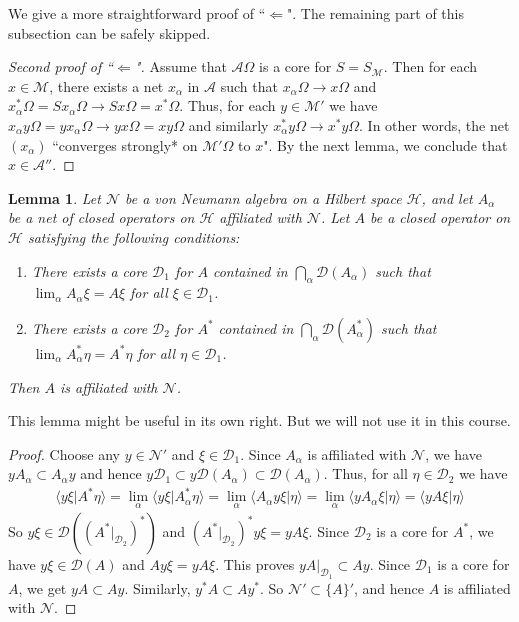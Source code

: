 \documentclass[12pt,b5paper,notitlepage]{article}
\theoremstyle{definition}
\theoremstyle{plain}
\newtheorem{lm}[df]{Lemma}
\newcommand{\mc}{\mathcal}
\newcommand{\Dom}{\scr{D}}
\newcommand{\bk}[1]{\langle {#1}\rangle}
\newcommand{\scr}{\mathscr}
\numberwithin{equation}{section}
\begin{document}
We give a more straightforward proof of ``$\Leftarrow$". The remaining part of this subsection can be safely skipped.

\begin{proof}[Second proof of ``$\Leftarrow$"]
Assume that $\mc A\Omega$ is a core for $S=S_{\mc M}$. Then for each $x\in\mc M$, there exists a net $x_\alpha$ in $\mc A$ such that $x_\alpha\Omega\rightarrow x\Omega$ and $x_\alpha^*\Omega=Sx_\alpha\Omega\rightarrow Sx\Omega=x^*\Omega$. Thus, for each $y\in\mc M'$ we have $x_\alpha y\Omega=yx_\alpha\Omega\rightarrow yx\Omega=xy\Omega$ and similarly $x_\alpha^*y\Omega\rightarrow x^*y\Omega$. In other words, the net $(x_\alpha)$ ``converges strongly* on $\mc M'\Omega$ to $x$". By the next lemma, we conclude that $x\in\mc A''$.
\end{proof}


\begin{lm}
Let $\mc N$ be a von Neumann algebra on a Hilbert space $\mc H$, and let $A_\alpha$ be a net of closed operators on $\mc H$ affiliated with $\mc N$. Let $A$ be a closed operator on $\mc H$ satisfying the following conditions:
\begin{enumerate}[label=(\alph*)]
\item There exists a core $\Dom_1$ for $A$ contained in $\bigcap_\alpha\Dom(A_\alpha)$ such that $\lim_\alpha A_\alpha\xi=A\xi$ for all $\xi\in\Dom_1$.
\item There exists a core $\Dom_2$ for $A^*$ contained in $\bigcap_\alpha\Dom(A_\alpha^*)$ such that $\lim_\alpha A_\alpha^*\eta=A^*\eta$ for all $\eta\in\Dom_1$.
\end{enumerate}
Then $A$ is affiliated with $\mc N$.
\end{lm}

This lemma might be useful in its own right. But we will not use it in this course.

\begin{proof}
Choose any $y\in\mc N'$ and $\xi\in\Dom_1$. Since $A_\alpha$ is affiliated with $\mc N$, we have $yA_\alpha\subset A_\alpha y$ and hence $y\Dom_1\subset y\Dom(A_\alpha)\subset \Dom(A_\alpha)$. Thus, for all $\eta\in\Dom_2$ we have
\begin{align*}
\bk{y\xi|A^*\eta}=\lim_\alpha \bk{y\xi|A_\alpha^*\eta}=\lim_\alpha \bk{A_\alpha y\xi|\eta}=\lim_\alpha \bk{yA_\alpha\xi|\eta}=\bk{yA\xi|\eta}
\end{align*}
So $y\xi\in\Dom((A^*|_{\Dom_2})^*)$ and $(A^*|_{\Dom_2})^*y\xi=yA\xi$. Since $\Dom_2$ is a core for $A^*$, we have $y\xi\in\Dom(A)$ and $Ay\xi=yA\xi$. This proves $yA|_{\Dom_1}\subset Ay$. Since $\Dom_1$ is a core for $A$, we get $yA\subset Ay$. Similarly, $y^*A\subset Ay^*$. So $\mc N'\subset\{A\}'$, and hence $A$ is affiliated with $\mc N$.
\end{proof}
\end{document}

